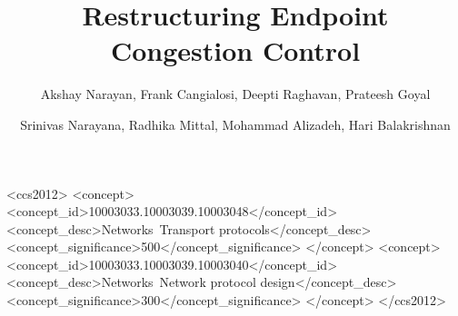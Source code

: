 \documentclass[format=sigconf,10pt,natbib=false]{acmart}
\begin{document}
\title{Restructuring Endpoint Congestion Control}
\author{Akshay Narayan, Frank Cangialosi, Deepti Raghavan, Prateesh Goyal}
\author{Srinivas Narayana, Radhika Mittal, Mohammad Alizadeh, Hari Balakrishnan}
\begin{CCSXML}
<ccs2012>
<concept>
<concept_id>10003033.10003039.10003048</concept_id>
<concept_desc>Networks~Transport protocols</concept_desc>
<concept_significance>500</concept_significance>
</concept>
<concept>
<concept_id>10003033.10003039.10003040</concept_id>
<concept_desc>Networks~Network protocol design</concept_desc>
<concept_significance>300</concept_significance>
</concept>
</ccs2012>
\end{CCSXML}

\newcommand*{\origrightarrow}{$\rightarrow$}
\let\oldarrow\textrightarrow
\renewcommand*{\textrightarrow}{\fontfamily{cmr}\selectfont\origrightarrow}
\renewcommand{\shortauthors}{Akshay Narayan, Frank Cangialosi, Deepti Raghavan, et al.}

\begin{sloppypar}

\maketitle












\begin{appendices}

\end{appendices}
\end{sloppypar}
\end{document}
